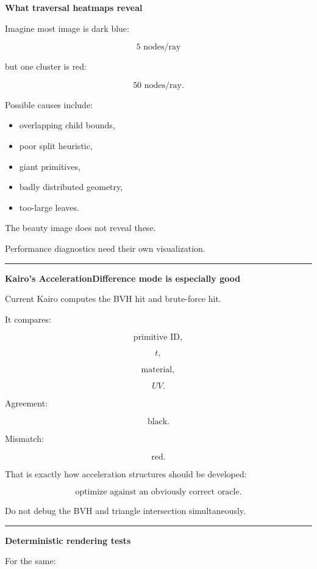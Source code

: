 \textbf{What traversal heatmaps reveal}

Imagine most image is dark blue:

\[
5\text{ nodes/ray}
\]

but one cluster is red:

\[
50\text{ nodes/ray}.
\]

Possible causes include:

\begin{itemize}
\tightlist
\item
  overlapping child bounds,
\item
  poor split heuristic,
\item
  giant primitives,
\item
  badly distributed geometry,
\item
  too-large leaves.
\end{itemize}

The beauty image does not reveal these.

Performance diagnostics need their own visualization.

\begin{center}\rule{0.5\linewidth}{0.5pt}\end{center}

\textbf{Kairo's AccelerationDifference mode is especially good}

Current Kairo computes the BVH hit and brute-force hit.

It compares:

\[
\text{primitive ID},
\]

\[
t,
\]

\[
\text{material},
\]

\[
UV.
\]

Agreement:

\[
\text{black}.
\]

Mismatch:

\[
\text{red}.
\]

That is exactly how acceleration structures should be developed:

\[
\boxed{
\text{optimize against an obviously correct oracle}.
}
\]

Do not debug the BVH and triangle intersection simultaneously.

\begin{center}\rule{0.5\linewidth}{0.5pt}\end{center}

\textbf{Deterministic rendering tests}

For the same:

